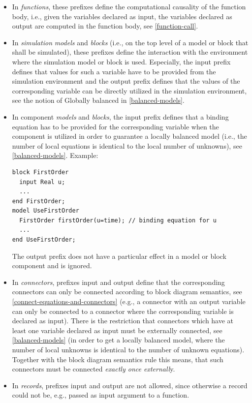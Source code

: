 \documentclass[10pt,a4paper]{report}
\begin{document}
\begin{itemize}
\item
  In \emph{functions}, these prefixes define the computational causality
  of the function body, i.e., given the variables declared as input, the
  variables declared as output are computed in the function body, see
  \ref{function-call}.
\item
  In \emph{simulation} \emph{models} and \emph{blocks} (i.e., on the top
  level of a model or block that shall be simulated), these prefixes
  define the interaction with the environment where the simulation model
  or block is used. Especially, the input prefix defines that values for
  such a variable have to be provided from the simulation environment
  and the output prefix defines that the values of the corresponding
  variable can be directly utilized in the simulation environment, see
  the notion of Globally balanced in \ref{balanced-models}.
\item
  In component \emph{models} and \emph{blocks}, the input prefix defines
  that a binding equation has to be provided for the corresponding
  variable when the component is utilized in order to guarantee a
  locally balanced model (i.e., the number of local equations is
  identical to the local number of unknowns), see \ref{balanced-models}. Example:

\begin{lstlisting}[language=modelica]
block FirstOrder
  input Real u;
  ...
end FirstOrder;
model UseFirstOrder
  FirstOrder firstOrder(u=time); // binding equation for u
  ...
end UseFirstOrder;
\end{lstlisting}

The output prefix does not have a particular effect in a model or block
component and is ignored.
\item
  In \emph{connectors}, prefixes input and output define that the
  corresponding connectors can only be connected according to block
  diagram semantics, see \ref{connect-equations-and-connectors} (e.g., a connector with an output
  variable can only be connected to a connector where the corresponding
  variable is declared as input). There is the restriction that
  connectors which have at least one variable declared as input must be
  externally connected, see \ref{balanced-models} (in order to get a locally
  balanced model, where the number of local unknowns is identical to the
  number of unknown equations). Together with the block diagram
  semantics rule this means, that such connectors must be connected
  \emph{exactly once externall}y.
\item
  In \emph{records}, prefixes input and output are not allowed, since
  otherwise a record could not be, e.g., passed as input argument to a
  function.
\end{itemize}
\end{document}
